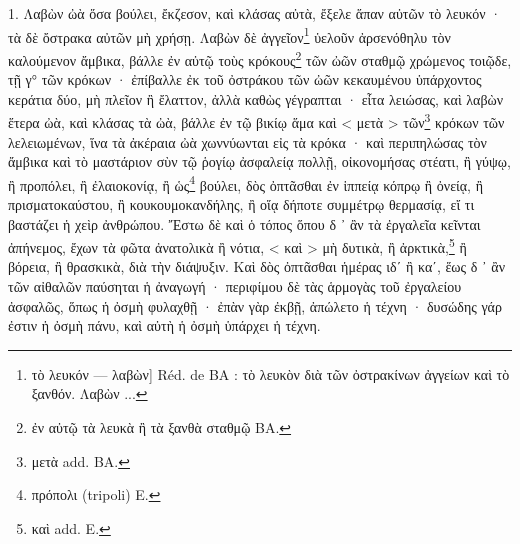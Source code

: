 \documentclass[a4paper, 11pt, oneside, polutonikogreek, french]{article}
\begin{document}
1. Λαβὼν ὠὰ ὅσα βούλει, ἔκζεσον, καὶ κλάσας αὐτὰ, ἔξελε ἅπαν αὐτῶν τὸ λευκόν · τὰ δὲ ὄστρακα αὐτῶν μὴ χρήσῃ. Λαβὼν δὲ ἀγγεῖον\footnote{τὸ λευκόν --- λαβὼν] Réd. de BA : τὸ λευκὸν διὰ τῶν ὀστρακίνων ἀγγείων καὶ τὸ ξανθόν. Λαβὼν ...} ὑελοῦν ἀρσενόθηλυ τὸν καλούμενον ἄμβικα, βάλλε ἐν αὐτῷ τοὺς κρόκους\footnote{ἐν αὐτῷ τὰ λευκὰ ἢ τὰ ξανθὰ σταθμῷ BA.} τῶν ὠῶν σταθμῷ χρώμενος τοιῷδε, τῇ γ° τῶν κρόκων · ἐπίβαλλε ἐκ τοῦ ὀστράκου τῶν ὠῶν κεκαυμένου ὑπάρχοντος κεράτια δύο, μὴ πλεῖον ἢ ἔλαττον, ἀλλὰ καθὼς γέγραπται · εἶτα λειώσας, καὶ λαβὼν ἕτερα ὠὰ, καὶ κλάσας τὰ ὠὰ, βάλλε ἐν τῷ βικίῳ ἅμα καὶ < μετὰ > τῶν\footnote{μετὰ add. BA.} κρόκων τῶν λελειωμένων, ἵνα τὰ ἀκέραια ὠὰ χωννύωνται εἰς τὰ κρόκα · καὶ περιπηλώσας τὸν ἄμβικα καὶ τὸ μαστάριον σὺν τῷ ῥογίῳ ἀσφαλείᾳ πολλῇ, οἰκονομήσας στέατι, ἢ γύψῳ, ἢ προπόλει, ἢ ἐλαιοκονίᾳ, ἢ ὡς\footnote{πρόπολι (tripoli) E.} βούλει, δὸς ὀπτᾶσθαι ἐν ἱππείᾳ κόπρῳ ἢ ὀνείᾳ, ἢ πρισματοκαύστου, ἢ κουκουμοκανδήλης, ἢ οἵᾳ δήποτε συμμέτρῳ θερμασίᾳ, εἴ τι βαστάζει ἡ χεὶρ ἀνθρώπου. Ἔστω δὲ καὶ ὁ τόπος ὅπου δ ᾽ ἂν τὰ ἐργαλεῖα κεῖνται ἀπήνεμος, ἔχων τὰ φῶτα ἀνατολικὰ ἢ νότια, < καὶ > μὴ δυτικὰ, ἢ ἀρκτικὰ,\footnote{καὶ add. E.} ἢ βόρεια, ἢ θρασκικὰ, διὰ τὴν διάψυξιν. Καὶ δὸς ὀπτᾶσθαι ἡμέρας ιδʹ ἢ καʹ, ἕως δ ᾽ ἂν τῶν αἰθαλῶν παύσηται ἡ ἀναγωγή · περιφίμου δὲ τὰς ἁρμογὰς τοῦ ἐργαλείου ἀσφαλῶς, ὅπως ἡ ὀσμὴ φυλαχθῇ · ἐπὰν γὰρ ἐκβῇ, ἀπώλετο ἡ τέχνη · δυσώδης γάρ ἐστιν ἡ ὀσμὴ πάνυ, καὶ αὐτὴ ἡ ὀσμὴ ὑπάρχει ἡ τέχνη.
\end{document}

